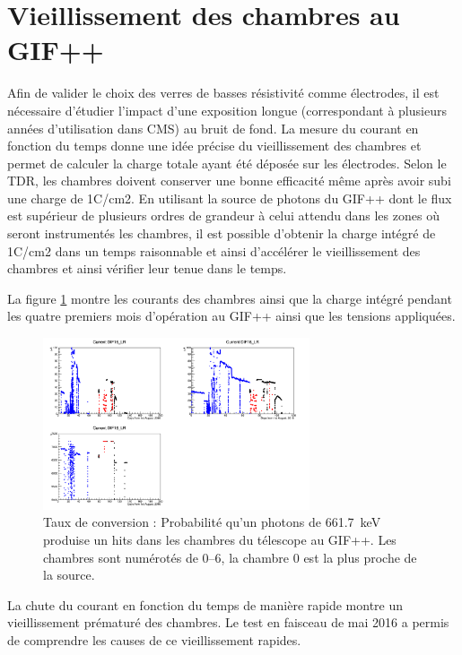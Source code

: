 \section{Vieillissement des chambres au GIF++}
Afin de valider le choix des verres de basses résistivité comme électrodes, il est nécessaire d'étudier l'impact d'une exposition longue (correspondant à plusieurs années d'utilisation dans CMS) au bruit de fond. La mesure du courant en fonction du temps donne une idée précise du vieillissement des chambres et permet de calculer la charge totale ayant été déposée sur les électrodes. Selon le TDR, les chambres doivent conserver une bonne efficacité même après avoir subi une charge de 1C/cm2. En utilisant la source de photons du GIF++ dont le flux est supérieur de plusieurs ordres de grandeur à celui attendu dans les zones où seront instrumentés les chambres, il est possible d'obtenir la charge intégré de 1C/cm2 dans un temps raisonnable et ainsi d'accélérer le vieillissement des chambres et ainsi vérifier leur tenue dans le temps.

La figure \ref{Courant} montre les courants des chambres ainsi que la charge intégré pendant les quatre premiers mois d'opération au GIF++ ainsi que les tensions appliquées. 

\begin{figure}[!ht]
	\centering
	\includegraphics[width=0.7\textwidth]{GLA/DIF16.png}
	\caption{Taux de conversion : Probabilité qu'un photons de \SI{661.7}{\kilo\eV} produise un hits dans les chambres du télescope au GIF++. Les chambres sont numérotés de \SIrange{0}{6}{}, la chambre \num{0} est la plus proche de la source.}
	\label{Courant}
\end{figure}


La chute du courant en fonction du temps de manière rapide montre un vieillissement prématuré des chambres. Le test en faisceau de mai 2016 a permis de comprendre les causes de ce vieillissement rapides.

